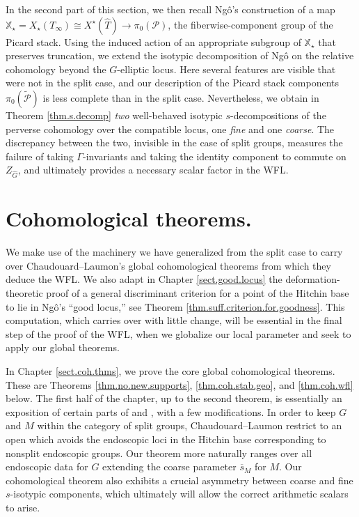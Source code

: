 \documentclass[openany]{amsbook}
\theoremstyle{definition}
\theoremstyle{remark}
\numberwithin{equation}{section}
\newcommand{\cP}{\mathcal{P}}
\newcommand{\ol}[1]{\overline{#1}}
\renewcommand{\-}{\operatorname{-}}
\newcommand{\ctP}{\widetilde{\cP}}
\newcommand{\bX}{\mathbb{X}}
\begin{document}
In the second part of this section, we then recall Ng\^{o}'s construction of a map $\bX_\star = X_\star(T_\infty) \cong X^\star(\widehat{T}) \to \pi_0(\cP)$, the fiberwise-component group of the Picard stack. Using the induced action of an appropriate subgroup of $\bX_\star$ that preserves truncation, we extend the isotypic decomposition of Ng\^{o} on the relative cohomology beyond the $G$-elliptic locus. Here several features are visible that were not in the split case, and our description of the Picard stack components $\pi_0(\ctP)$ is less complete than in the split case. Nevertheless, we obtain in Theorem \ref{thm.s.decomp} \emph{two} well-behaved isotypic $s$-decompositions of the perverse cohomology over the compatible locus, one \emph{fine} and one \emph{coarse}. The discrepancy between the two, invisible in the case of split groups, measures the failure of taking $\Gamma$-invariants and taking the identity component to commute on $Z_{\widehat{G}}$, and ultimately provides a necessary scalar factor in the WFL.




\section{Cohomological theorems.}

We make use of the machinery we have generalized from the split case to carry over Chaudouard--Laumon's global cohomological theorems from which they deduce the WFL. We also adapt in Chapter \ref{sect.good.locus} the deformation-theoretic proof of a general discriminant criterion for a point of the Hitchin base to lie in Ng\^{o}'s ``good locus,'' see Theorem \ref{thm.suff.criterion.for.goodness}. This computation, which carries over with little change, will be essential in the final step of the proof of the WFL, when we globalize our local parameter and seek to apply our global theorems. 

In Chapter \ref{sect.coh.thms}, we prove the core global cohomological theorems. These are Theorems \ref{thm.no.new.supports}, \ref{thm.coh.stab.geo}, and \ref{thm.coh.wfl} below. The first half of the chapter, up to the second theorem, is essentially an exposition of certain parts of \cite[\S 7]{ngofl} and \cite[\S 10]{CLII}, with a few modifications. In order to keep $G$ and $M$ within the category of split groups, Chaudouard--Laumon restrict to an open which avoids the endoscopic loci in the Hitchin base corresponding to nonsplit endoscopic groups. Our theorem more naturally ranges over all endoscopic data for $G$ extending the coarse parameter $\ol{s}_M$ for $M$. Our cohomological theorem also exhibits a crucial asymmetry between coarse and fine $s$-isotypic components, which ultimately will allow the correct arithmetic scalars to arise. 
\end{document}
